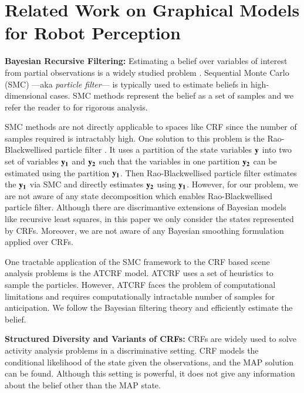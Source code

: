 \section{Related Work on Graphical Models for Robot Perception}
\label{relwork}
\noindent
{\bf Bayesian Recursive Filtering:}
\label{parf}
Estimating a belief over variables of interest from partial observations is a widely studied problem \cite{thrunBook}. Sequential Monte Carlo (SMC) ---aka \emph{particle filter}--- is typically used to estimate beliefs in high-dimensional cases. SMC methods represent the belief as a set of samples and we refer the reader to \cite{meanFieldBook} for rigorous analysis.

SMC methods are not directly applicable to spaces like CRF since the number of samples required is intractably high. One solution to this problem is the Rao-Blackwellised particle filter \cite{raob}. It uses a partition of the state variables $\bf{y}$ into two set of variables $\bf{y}_1$ and $\bf{y}_2$ such that the variables in one partition $\bf{y}_2$ can be estimated using the partition $\bf{y}_1$. Then Rao-Blackwellised particle filter \cite{raob} estimates the $\bf{y}_1$ via SMC and directly estimates $\bf{y}_2$ using $\bf{y}_1$. However, for our problem, we are not aware of any state decomposition which enables Rao-Blackwellised particle filter. Although there are discrimantive extensions of Bayesian models like recursive least squares\cite{sarkka}, in this paper we only consider the states represented by CRFs. Moreover, we are not aware of any Bayesian smoothing formulation applied over CRFs.

One tractable application of the SMC framework to the CRF based scene analysis problems is the ATCRF \cite{hemaAnt} model. ATCRF \cite{hemaAnt} uses a set of heuristics to sample the particles. However, ATCRF faces the problem of computational limitations and requires computationally intractable number of samples for anticipation. We follow the Bayesian filtering theory and efficiently estimate the belief.

\noindent
{\bf Structured Diversity and Variants of CRFs:}
CRFs are widely used to solve activity analysis problems \cite{siminchi2005,quattoni2007} in a discriminative setting. CRF models the conditional likelihood of the state given the observations, and the MAP solution can be found. Although this setting is powerful, it does not give any information about the belief other than the MAP state.

